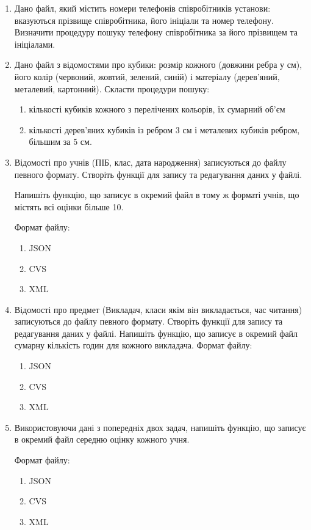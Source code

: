\documentclass[]{article}
\makeatletter
\newcommand{\xslalph}[1]{\expandafter\@xslalph\csname c@#1\endcsname}
\newcommand{\@xslalph}[1]{%
    \ifcase#1\or а\or б\or в\or г\or д\or e\or є\or ж\or з\or i%
    \or й\or к\or л\or м\or н\or о\or п\or р\or с\or т%
    \or у\or ф\or х\or ц\or ч\or ш\or ю\or я\or аа\or бб\or вв %
    \else\@ctrerr\fi%
}
\makeatother
\begin{document}
\begin{enumerate}
\item
Дано файл, який містить номери телефонів співробітників установи:
вказуються прізвище співробітника, його ініціали та номер телефону.
Визначити процедуру пошуку телефону співробітника за його прізвищем та
ініціалами.
\item
Дано файл з відомостями про кубики: розмір кожного (довжини ребра у см),
його колір (червоний, жовтий, зелений, синій) і матеріалу (дерев'яний,
металевий, картонний). Скласти процедури пошуку:
\begin{enumerate}[label=\xslalph*)]
\item кількості кубиків кожного з перелічених кольорів, їх сумарний об'єм

\item кількості дерев'яних кубиків із ребром 3 см і металевих кубиків
ребром, більшим за 5 см.
\end{enumerate}

\item
Відомості про учнів (ПІБ, клас, дата народження) записуються до файлу
певного формату. Створіть функції для запису та редагування даних у
файлі.

Напишіть функцію, що записує в окремий файл в тому ж форматі учнів, що
містять всі оцінки більше 10.

Формат файлу:
\begin{enumerate}[label=\xslalph*)]
\item
JSON
\item
CVS
\item
XML
\end{enumerate}

\item
Відомості про предмет (Викладач, класи якім він викладається, час
читання) записуються до файлу певного формату. Створіть функції для
запису та редагування даних у файлі. Напишіть функцію, що записує в
окремий файл сумарну кількість годин для кожного викладача.
Формат файлу:
\begin{enumerate}[label=\xslalph*)]
\item
JSON
\item
CVS
\item
XML
\end{enumerate}

\item
Використовуючи дані з попередніх двох задач, напишіть функцію, що
записує в окремий файл середню оцінку кожного учня.

Формат файлу:
\begin{enumerate}[label=\xslalph*)]
\item
JSON
\item
CVS
\item
XML
\end{enumerate}


\end{enumerate}
\end{document}
